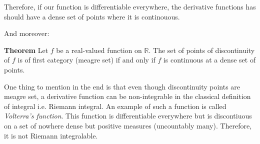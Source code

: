 \documentclass[11pt]{article}
\begin{document}
Therefore, if our function is differentiable everywhere, the derivative functions has should have a dense set of points where it is continouous.

And moreover:

\textbf{Theorem} Let \(f\) be a real-valued function on \(\mathbb{R}\). The set of points of discontinuity of \(f\) is of first category (meagre set) if and only if \(f\) is continuous at a dense set of points.

One thing to mention in the end is that even though discontinuity points are meagre set, a derivative function can be non-integrable in the classical definition of integral i.e. Riemann integral.
An example of such a function is called \emph{Volterra's function}.
This function is differentiable everywhere but is discontiuous on a set of nowhere dense but positive measures (uncountably many).
Therefore, it is not Riemann integralable.
\end{document}
